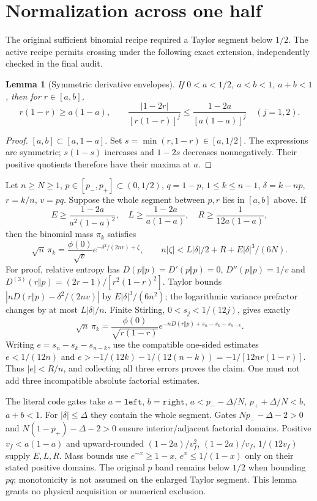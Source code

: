 \documentclass[11pt,a4paper]{article}
\newtheorem{lemma}[theorem]{Lemma}
\begin{document}
\section{Normalization across one half}\label{app:norm}
The original sufficient binomial recipe required a Taylor segment below
$1/2$. The active recipe permits crossing under the following exact
extension, independently checked in the final audit.

\begin{lemma}[Symmetric derivative envelopes]
If $0<a<1/2$, $a<b<1$, $a+b<1$, then for $r\in[a,b]$,
\[
 r(1-r)\ge a(1-a),\qquad
 \frac{|1-2r|}{[r(1-r)]^j}\le\frac{1-2a}{[a(1-a)]^j}\quad(j=1,2).
\]
\end{lemma}
\begin{proof}
$[a,b]\subset[a,1-a]$. Set $s=\min(r,1-r)\in[a,1/2]$. The expressions
are symmetric; $s(1-s)$ increases and $1-2s$ decreases nonnegatively.
Their positive quotients therefore have their maxima at $a$.
\end{proof}
Let $n\ge N\ge1$, $p\in[p_-,p_+]\subset(0,1/2)$, $q=1-p$,
$1\le k\le n-1$, $\delta=k-np$, $r=k/n$, $v=pq$. Suppose the whole
segment between $p,r$ lies in $[a,b]$ above. If
\[
 E\ge\frac{1-2a}{a^2(1-a)^2},\quad L\ge\frac{1-2a}{a(1-a)},
 \quad R\ge\frac1{12a(1-a)},
\]
then the binomial mass $\pi_k$ satisfies
\[
 \sqrt n\,\pi_k=\frac{\phi(0)}{\sqrt v}
 e^{-\delta^2/(2nv)+\zeta},\qquad
 n|\zeta|<L|\delta|/2+R+E|\delta|^3/(6N).
\]
For proof, relative entropy has $D(p\Vert p)=D'(p\Vert p)=0$,
$D''(p\Vert p)=1/v$ and
$D^{(3)}(r\Vert p)=(2r-1)/[r^2(1-r)^2]$.
Taylor bounds $|nD(r\Vert p)-\delta^2/(2nv)|$ by
$E|\delta|^3/(6n^2)$; the logarithmic variance prefactor changes by at
most $L|\delta|/n$. Finite Stirling, $0<s_j<1/(12j)$, gives exactly
\[
 \sqrt n\,\pi_k=\frac{\phi(0)}{\sqrt{r(1-r)}}
 e^{-nD(r\Vert p)+s_n-s_k-s_{n-k}}.
\]
Writing $e=s_n-s_k-s_{n-k}$, use the compatible one-sided estimates
$e<1/(12n)$ and
$e>-1/(12k)-1/(12(n-k))=-1/[12nr(1-r)]$.
Thus $|e|<R/n$, and collecting all three errors proves the claim.
One must not add three incompatible absolute factorial estimates.

The literal code gates take $a=\texttt{left}$, $b=\texttt{right}$,
$a<p_- -\Delta/N$, $p_++\Delta/N<b$, $a+b<1$.
For $|\delta|\le\Delta$ they contain the whole segment. Gates
$Np_- -\Delta-2>0$ and $N(1-p_+)-\Delta-2>0$ ensure interior/adjacent
factorial domains. Positive $v_f<a(1-a)$ and upward-rounded
$(1-2a)/v_f^2$, $(1-2a)/v_f$, $1/(12v_f)$ supply $E,L,R$.
Mass bounds use $e^{-x}\ge1-x$, $e^x\le1/(1-x)$ only on their stated
positive domains. The original $p$ band remains below $1/2$ when bounding
$pq$; monotonicity is not assumed on the enlarged Taylor segment.
This lemma grants no physical acquisition or numerical exclusion.
\end{document}
